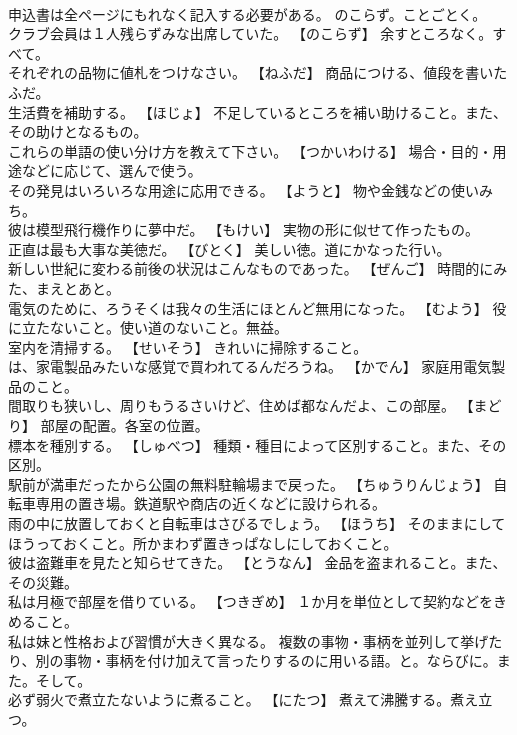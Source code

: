 \documentclass[8pt]{extreport}
\begin{document}
\begin{CJK}{UTF8}{min}
\\	申込書は全ページにもれなく記入する必要がある。	のこらず。ことごとく。
\\	クラブ会員は１人残らずみな出席していた。	【のこらず】 余すところなく。すべて。
\\	それぞれの品物に値札をつけなさい。	【ねふだ】 商品につける、値段を書いたふだ。
\\	生活費を補助する。	【ほじょ】 不足しているところを補い助けること。また、その助けとなるもの。
\\	これらの単語の使い分け方を教えて下さい。	【つかいわける】 場合・目的・用途などに応じて、選んで使う。
\\	その発見はいろいろな用途に応用できる。	【ようと】 物や金銭などの使いみち。
\\	彼は模型飛行機作りに夢中だ。	【もけい】 実物の形に似せて作ったもの。
\\	正直は最も大事な美徳だ。	【びとく】 美しい徳。道にかなった行い。
\\	新しい世紀に変わる前後の状況はこんなものであった。	【ぜんご】 時間的にみた、まえとあと。
\\	電気のために、ろうそくは我々の生活にほとんど無用になった。	【むよう】 役に立たないこと。使い道のないこと。無益。
\\	室内を清掃する。	【せいそう】 きれいに掃除すること。
\\	は、家電製品みたいな感覚で買われてるんだろうね。	【かでん】 家庭用電気製品のこと。
\\	間取りも狭いし、周りもうるさいけど、住めば都なんだよ、この部屋。	【まどり】 部屋の配置。各室の位置。
\\	標本を種別する。	【しゅべつ】 種類・種目によって区別すること。また、その区別。
\\	駅前が満車だったから公園の無料駐輪場まで戻った。	【ちゅうりんじょう】 自転車専用の置き場。鉄道駅や商店の近くなどに設けられる。
\\	雨の中に放置しておくと自転車はさびるでしょう。	【ほうち】 そのままにしてほうっておくこと。所かまわず置きっぱなしにしておくこと。
\\	彼は盗難車を見たと知らせてきた。	【とうなん】 金品を盗まれること。また、その災難。
\\	私は月極で部屋を借りている。	【つきぎめ】 １か月を単位として契約などをきめること。
\\	私は妹と性格および習慣が大きく異なる。	複数の事物・事柄を並列して挙げたり、別の事物・事柄を付け加えて言ったりするのに用いる語。と。ならびに。また。そして。
\\	必ず弱火で煮立たないように煮ること。	【にたつ】 煮えて沸騰する。煮え立つ。

\end{CJK}
\end{document}
